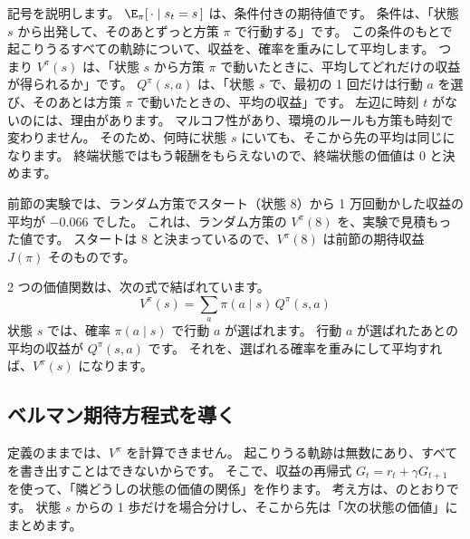 記号を説明します。
$\E_\pi[\,\cdot\mid s_t=s\,]$ は、条件付きの期待値です。
条件は、「状態 $s$ から出発して、そのあとずっと方策 $\pi$ で行動する」です。
この条件のもとで起こりうるすべての軌跡について、収益を、確率を重みにして平均します。
つまり $V^\pi(s)$ は、「状態 $s$ から方策 $\pi$ で動いたときに、平均してどれだけの収益が得られるか」です。
$Q^\pi(s,a)$ は、「状態 $s$ で、最初の 1 回だけは行動 $a$ を選び、そのあとは方策 $\pi$ で動いたときの、平均の収益」です。
左辺に時刻 $t$ がないのには、理由があります。
マルコフ性があり、環境のルールも方策も時刻で変わりません。
そのため、何時に状態 $s$ にいても、そこから先の平均は同じになります。
終端状態ではもう報酬をもらえないので、終端状態の価値は 0 と決めます。

前節の実験では、ランダム方策でスタート（状態 8）から 1 万回動かした収益の平均が $-0.066$ でした。
これは、ランダム方策の $V^\pi(8)$ を、実験で見積もった値です。
スタートは 8 と決まっているので、$V^\pi(8)$ は前節の期待収益 $J(\pi)$ そのものです。

2 つの価値関数は、次の式で結ばれています。
\begin{equation}
V^\pi(s)=\sum_{a}\pi(a\mid s)\,Q^\pi(s,a)
\label{eq:rlb-v-from-q}
\end{equation}
状態 $s$ では、確率 $\pi(a\mid s)$ で行動 $a$ が選ばれます。
行動 $a$ が選ばれたあとの平均の収益が $Q^\pi(s,a)$ です。
それを、選ばれる確率を重みにして平均すれば、$V^\pi(s)$ になります。

\subsection*{ベルマン期待方程式を導く}

定義のままでは、$V^\pi$ を計算できません。
起こりうる軌跡は無数にあり、すべてを書き出すことはできないからです。
そこで、収益の再帰式 $G_t=r_t+\gamma G_{t+1}$ を使って、「隣どうしの状態の価値の関係」を作ります。
考え方は、のとおりです。
状態 $s$ からの 1 歩だけを場合分けし、そこから先は「次の状態の価値」にまとめます。

